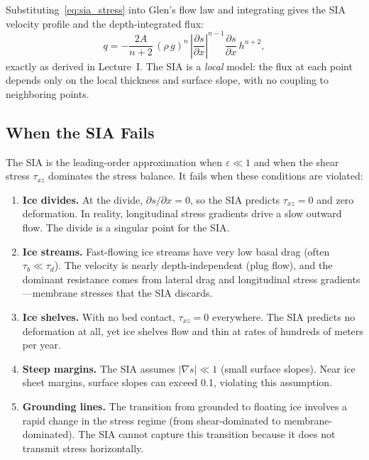 \documentclass[11pt]{article}
\begin{document}
\medskip
\noindent Substituting~\eqref{eq:sia_stress} into Glen's flow law and integrating gives the SIA velocity profile and the depth-integrated flux:
\begin{equation}
  q = -\frac{2A}{n+2}\,(\rho\,g)^n\,\left|\frac{\partial s}{\partial x}\right|^{n-1}\frac{\partial s}{\partial x}\,h^{n+2},
  \label{eq:sia_flux}
\end{equation}
exactly as derived in Lecture~I.  The SIA is a \emph{local} model: the flux at each point depends only on the local thickness and surface slope, with no coupling to neighboring points.

\subsection{When the SIA Fails}

The SIA is the leading-order approximation when $\varepsilon \ll 1$ and when the shear stress $\tau_{xz}$ dominates the stress balance.  It fails when these conditions are violated:

\begin{enumerate}
  \item \textbf{Ice divides.}  At the divide, $\partial s/\partial x = 0$, so the SIA predicts $\tau_{xz} = 0$ and zero deformation.  In reality, longitudinal stress gradients drive a slow outward flow.  The divide is a singular point for the SIA.

  \item \textbf{Ice streams.}  Fast-flowing ice streams have very low basal drag (often $\tau_b \ll \tau_d$).  The velocity is nearly depth-independent (plug flow), and the dominant resistance comes from lateral drag and longitudinal stress gradients---membrane stresses that the SIA discards.

  \item \textbf{Ice shelves.}  With no bed contact, $\tau_{xz} = 0$ everywhere.  The SIA predicts no deformation at all, yet ice shelves flow and thin at rates of hundreds of meters per year.

  \item \textbf{Steep margins.}  The SIA assumes $|\nabla s| \ll 1$ (small surface slopes).  Near ice sheet margins, surface slopes can exceed 0.1, violating this assumption.

  \item \textbf{Grounding lines.}  The transition from grounded to floating ice involves a rapid change in the stress regime (from shear-dominated to membrane-dominated).  The SIA cannot capture this transition because it does not transmit stress horizontally.
\end{enumerate}
\end{document}
